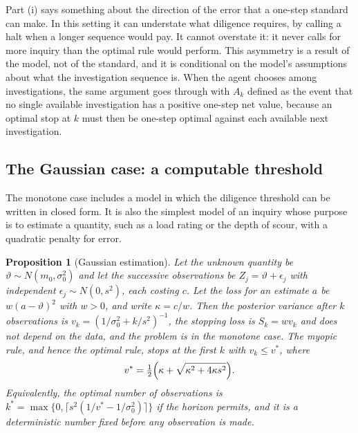 \documentclass[11pt]{article}
\theoremstyle{plain}
\newtheorem{proposition}{Proposition}
\theoremstyle{definition}
\begin{document}
Part (i) says something about the direction of the error that a one-step standard can make. In this setting it can understate what diligence requires, by calling a halt when a longer sequence would pay. It cannot overstate it: it never calls for more inquiry than the optimal rule would perform. This asymmetry is a result of the model, not of the standard, and it is conditional on the model's assumptions about what the investigation sequence is. When the agent chooses among investigations, the same argument goes through with $A_k$ defined as the event that no single available investigation has a positive one-step net value, because an optimal stop at $k$ must then be one-step optimal against each available next investigation.

\subsection{The Gaussian case: a computable threshold}

The monotone case includes a model in which the diligence threshold can be written in closed form. It is also the simplest model of an inquiry whose purpose is to estimate a quantity, such as a load rating or the depth of scour, with a quadratic penalty for error.

\begin{proposition}[Gaussian estimation]\label{prop:gaussian}
Let the unknown quantity be $\vartheta\sim N(m_0,\sigma_0^2)$ and let the successive observations be $Z_j=\vartheta+\epsilon_j$ with independent $\epsilon_j\sim N(0,s^2)$, each costing $c$. Let the loss for an estimate $a$ be $w(a-\vartheta)^2$ with $w>0$, and write $\kappa=c/w$. Then the posterior variance after $k$ observations is $v_k=(1/\sigma_0^2+k/s^2)^{-1}$, the stopping loss is $S_k=wv_k$ and does not depend on the data, and the problem is in the monotone case. The myopic rule, and hence the optimal rule, stops at the first $k$ with $v_k\le v^*$, where
\[
v^*=\tfrac12\Bigl(\kappa+\sqrt{\kappa^2+4\kappa s^2}\Bigr).
\]
Equivalently, the optimal number of observations is $k^*=\max\{0,\lceil s^2(1/v^*-1/\sigma_0^2)\rceil\}$ if the horizon permits, and it is a deterministic number fixed before any observation is made.
\end{proposition}
\end{document}
